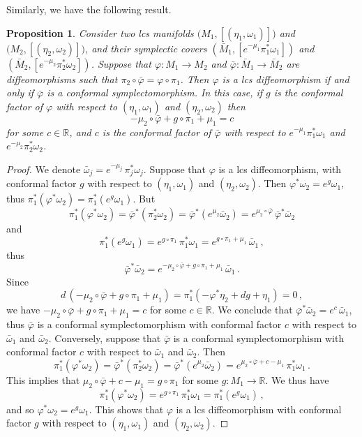 \documentclass{amsart}
\newtheorem{prop}[thm]{Proposition}
\theoremstyle{remark}
\begin{document}
Similarly, we have the following result.

\begin{prop}\label{proposition: lift of lcs diffeo to symplectic cover}
Consider two lcs manifolds $\big(M_1 , [(\eta_1, \omega_1)]\big)$
and $\big(M_2 , [(\eta_2, \omega_2)]\big)$,
and their symplectic covers
$(\bar{M}_1, [e^{-\mu_1}\pi_1^* \omega_1])$
and $(\bar{M}_2, [e^{-\mu_2}\pi_2^* \omega_2])$.
Suppose that $\varphi: M_1 \rightarrow M_2$
and $\bar{\varphi}: \bar{M}_1 \rightarrow \bar{M}_2$
are diffeomorphisms such that
$\pi_2 \circ \bar{\varphi} = \varphi \circ \pi_1$.
Then $\varphi$ is a lcs diffeomorphism
if and only if $\bar{\varphi}$ is a conformal symplectomorphism.
In this case,
if $g$ is the conformal factor of $\varphi$
with respect to $(\eta_1, \omega_1)$ and $(\eta_2, \omega_2)$
then
$$
- \mu_2 \circ \bar{\varphi} + g \circ \pi_1 + \mu_1 = c
$$
for some $c \in \mathbb{R}$,
and $c$ is the conformal factor of $\bar{\varphi}$
with respect to $e^{-\mu_1}\pi_1^* \omega_1$ and $e^{-\mu_2}\pi_2^* \omega_2$.
\end{prop}

\begin{proof}
We denote $\bar{\omega}_j = e^{-\mu_j} \, \pi_j^{\ast}\omega_j$.
Suppose that $\varphi$ is a lcs diffeomorphism,
with conformal factor $g$
with respect to $(\eta_1, \omega_1)$ and $(\eta_2, \omega_2)$.
Then $\varphi^{\ast}\omega_2 = e^g\omega_1$,
thus $\pi_1^{\ast} (\varphi^{\ast} \omega_2) = \pi_1^{\ast} (e^g \omega_1)$.
But
\[
\pi_1^{\ast} (\varphi^{\ast} \omega_2)
= \bar{\varphi}^{\ast} (\pi_2^{\ast} \omega_2)
= \bar{\varphi}^{\ast} ( e^{\mu_2} \bar{\omega}_2)
= e^{\mu_2 \circ \bar{\varphi}} \, \bar{\varphi}^{\ast} \bar{\omega}_2
\]
and
\[
\pi_1^{\ast} (e^g \omega_1)
= e^{g \circ \pi_1} \, \pi_1^{\ast} \omega_1
= e^{g \circ \pi_1 + \mu_1} \, \bar{\omega}_1 \,,
\]
thus
\[
\bar{\varphi}^{\ast} \bar{\omega}_2
= e^{- \mu_2 \circ \bar{\varphi} + g \circ \pi_1 + \mu_1} \, \bar{\omega}_1 \,.
\]
Since
\[
d \, (- \mu_2 \circ \bar{\varphi} + g \circ \pi_1 + \mu_1)
= \pi_1^{\ast} (- \varphi^{\ast} \eta_2 + dg + \eta_1) = 0 \,,
\]
we have $- \mu_2 \circ \bar{\varphi} + g \circ \pi_1 + \mu_1 = c$
for some $c \in \mathbb{R}$.
We conclude that
$\bar{\varphi}^{\ast} \bar{\omega}_2 = e^c \, \bar{\omega}_1$,
thus $\bar{\varphi}$ is a conformal symplectomorphism
with conformal factor $c$
with respect to $\bar{\omega}_1$ and $\bar{\omega}_2$.
Conversely,
suppose that $\bar{\varphi}$ is a conformal symplectomorphism
with conformal factor $c$
with respect to $\bar{\omega}_1$ and $\bar{\omega}_2$.
Then
$$
\pi_1^{\ast} (\varphi^{\ast} \omega_2)
= \bar{\varphi}^{\ast} (\pi_2^{\ast} \omega_2)
= \bar{\varphi}^{\ast} (e^{\mu_2} \bar{\omega}_2)
= e^{\mu_2 \circ \bar{\varphi} + c - \mu_1} \, \pi_1^{\ast} \omega_1 \,.
$$
This implies that
$\mu_2 \circ \bar{\varphi} + c - \mu_1 = g \circ \pi_1$
for some $g: M_1 \rightarrow \mathbb{R}$.
We thus have
\[
\pi_1^{\ast} (\varphi^{\ast} \omega_2) = e^{g \circ \pi_1} \, \pi_1^{\ast} \omega_1
= \pi_1^{\ast} (e^g \omega_1) \,,
\]
and so $\varphi^{\ast}\omega_2 = e^g \omega_1$.
This shows that $\varphi$ is a lcs diffeomorphism
with conformal factor $g$
with respect to $(\eta_1, \omega_1)$ and $(\eta_2, \omega_2)$.
\end{proof}
\end{document}
